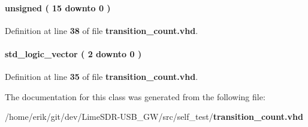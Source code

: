 \paragraph[{trans\+\_\+cnt}]{ {\bfseries \textcolor{comment}{unsigned}\textcolor{vhdlchar}{ }\textcolor{vhdlchar}{(}\textcolor{vhdlchar}{ }\textcolor{vhdlchar}{ } \textcolor{vhdldigit}{15} \textcolor{vhdlchar}{ }\textcolor{keywordflow}{downto}\textcolor{vhdlchar}{ }\textcolor{vhdlchar}{ } \textcolor{vhdldigit}{0} \textcolor{vhdlchar}{ }\textcolor{vhdlchar}{)}\textcolor{vhdlchar}{ }} \hspace{0.3cm}{\ttfamily [Signal]}}\label{classtransition__count_1_1arch_adc4e6415c2a84da98b5532f7ede9a9a8}


Definition at line {\bf 38} of file {\bf transition\+\_\+count.\+vhd}.

\paragraph[{trans\+\_\+wire\+\_\+reg}]{ {\bfseries \textcolor{comment}{std\+\_\+logic\+\_\+vector}\textcolor{vhdlchar}{ }\textcolor{vhdlchar}{(}\textcolor{vhdlchar}{ }\textcolor{vhdlchar}{ } \textcolor{vhdldigit}{2} \textcolor{vhdlchar}{ }\textcolor{keywordflow}{downto}\textcolor{vhdlchar}{ }\textcolor{vhdlchar}{ } \textcolor{vhdldigit}{0} \textcolor{vhdlchar}{ }\textcolor{vhdlchar}{)}\textcolor{vhdlchar}{ }} \hspace{0.3cm}{\ttfamily [Signal]}}\label{classtransition__count_1_1arch_a86f7c41393d549937398951e73b9f727}


Definition at line {\bf 35} of file {\bf transition\+\_\+count.\+vhd}.



The documentation for this class was generated from the following file\+:\begin{DoxyCompactItemize}
\item 
/home/erik/git/dev/\+Lime\+S\+D\+R-\/\+U\+S\+B\+\_\+\+G\+W/src/self\+\_\+test/{\bf transition\+\_\+count.\+vhd}\end{DoxyCompactItemize}
